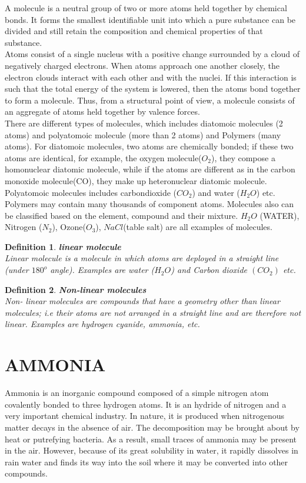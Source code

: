 \documentclass[a4paper, 12pt, openany]{report}
\newtheorem{defn}{Definition}[section]
\begin{document}
 A molecule is a neutral group of two or more atoms held together by chemical bonds. It forms the smallest identifiable unit into which a pure substance can be divided and still retain the composition and chemical properties of that substance.\\
 Atoms consist of a single nucleus with a positive change surrounded by a cloud of negatively charged electrons. When atoms approach one another closely, the electron clouds interact with each other and with the nuclei. If this interaction is such that the total energy of the system is lowered, then the atoms bond together to form a molecule. Thus, from a structural point of view, a molecule consists of an aggregate of atoms held together by valence forces. \\
 There are different types of molecules, which includes diatomoic molecules (2 atoms) and polyatomoic molecule (more than 2 atoms) and  Polymers (many atoms). For diatomoic molecules, two atoms are chemically bonded; if these two atoms are identical, for example, the oxygen molecule($O_2$), they compose a homonuclear diatomic molecule, while if the atoms are different as in the carbon monoxide molecule(CO), they make up heteronuclear diatomic molecule. Polyatomoic molecules includes carbondioxide ($CO_2$) and water ($H_2O$) etc.  Polymers may contain many thousands of component atoms. Molecules also can be classified based on the element, compound and their mixture. $H_2O$ (WATER), Nitrogen ($N_2$), Ozone($O_3$), $NaCl$(table salt) are all examples of molecules.
 \newpage
 \begin{defn}\textbf{linear molecule }\\
 	Linear molecule is a molecule in which atoms are deployed in a straight line (under $180^o$ angle). Examples are water ($H_2O$) and Carbon dioxide $(CO_2)$ etc.
 	 \end{defn} 
 \begin{defn} \textbf{Non-linear molecules}\\
 	Non- linear molecules are compounds that have a geometry other than linear molecules; i.e their atoms are not arranged in a straight line and are therefore not linear. Examples are hydrogen cyanide, ammonia, etc. 	
 \end{defn}
	\section{AMMONIA}
	Ammonia is an inorganic compound composed of a simple nitrogen atom covalently bonded to three hydrogen atoms.
		It is an hydride of nitrogen and a very important chemical industry. In nature, it is produced when nitrogenous matter decays in the absence of air. The decomposition may be brought about by heat or putrefying bacteria. As a result, small traces of ammonia may be present in the air. However, because of its great solubility in water, it rapidly dissolves in rain water and finds its way into the soil where it may be converted into other compounds.
	
\end{document}
